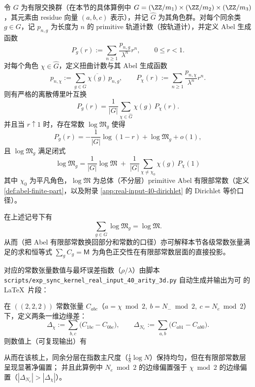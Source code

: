 \begin{remark}\label{prop:arity-chebotarev-mertens-fourier}
令 $G$ 为有限交换群（在本节的具体算例中 $G=(\ZZ/m_1)\times(\ZZ/m_2)\times(\ZZ/m_3)$，其元素由 residue 向量 $(a,b,c)$ 表示），并记 $\widehat G$ 为其角色群。对每个同余类 $g\in G$，记 $p_{n,g}$ 为长度为 $n$ 的 primitive 轨道计数（按轨道计），并定义 Abel 生成函数
$$
P_g(r):=\sum_{n\ge 1}\frac{p_{n,g}}{\lambda^n}r^n,\qquad 0\le r<1.
$$
对每个角色 $\chi\in\widehat G$，定义扭曲计数与其 Abel 生成函数
$$
p_{n,\chi}:=\sum_{g\in G}\overline{\chi(g)}\,p_{n,g},
\qquad
P_\chi(r):=\sum_{n\ge 1}\frac{p_{n,\chi}}{\lambda^n}r^n.
$$
则有严格的离散傅里叶互换
$$
P_g(r)=\frac{1}{|G|}\sum_{\chi\in\widehat G}\chi(g)\,P_\chi(r).
$$
并且当 $r\uparrow 1$ 时，存在常数 $\log\mathfrak{M}_g$ 使得
$$
P_g(r)=-\frac{1}{|G|}\log(1-r)+\log\mathfrak{M}_g+o(1),
$$
且 $\log\mathfrak{M}_g$ 满足闭式
$$
\boxed{\ 
\log\mathfrak{M}_g
=\frac{1}{|G|}\log\mathfrak{M}
\;+\;\frac{1}{|G|}\sum_{\chi\neq \chi_0}\chi(g)\,P_\chi(1)\ 
}
$$
其中 $\chi_0$ 为平凡角色，$\log\mathfrak{M}$ 为总体（不分层）primitive Abel 有限部常数（定义 \ref{def:abel-finite-part}，以及附录 \ref{app:real-input-40-dirichlet} 的 Dirichlet 等价口径）。
\end{remark}

\begin{remark}[常数张量的归一化一致性]\label{cor:arity-chebotarev-mertens-sum}
在上述记号下有
$$
\sum_{g\in G}\log\mathfrak{M}_g=\log\mathfrak{M}.
$$
从而（把 Abel 有限部常数换回部分和常数的口径）亦可解释本节各级常数张量满足的求和恒等式
$
\sum_g C_g=\mathsf{M}
$
为角色正交性在有限部常数层面的直接投影。
\end{remark}
对应的常数张量数值与最坏误差指数（$\rho/\lambda$）由脚本
\texttt{scripts/exp\_sync\_kernel\_real\_input\_40\_arity\_3d.py}
自动生成并输出为可 \verb|| 的 \LaTeX\ 片段：


\begin{remark}\label{cor:real-input-40-mertens-222-marginal-bias}
在 \(((2,2,2))\) 常数张量 \(C_{abc}\)（\(a=\chi\bmod 2,\ b=N_-\bmod 2,\ c=N_e\bmod 2\)）下，定义两条一维边缘差：
\[
\Delta_\chi:=\sum_{b,c}\bigl(C_{1bc}-C_{0bc}\bigr),\qquad
\Delta_{N_e}:=\sum_{a,b}\bigl(C_{ab1}-C_{ab0}\bigr).
\]
则数值上（可复现输出）有

从而在该核上，同余分层在指数主尺度（\(\tfrac18\log N\)）保持均匀，但在有限部常数层呈现显著净偏置；
并且此算例中 \(N_e\bmod 2\) 的边缘偏置强于 \(\chi\bmod 2\) 的边缘偏置（\(|\Delta_{N_e}|>|\Delta_\chi|\)）。
\end{remark}

